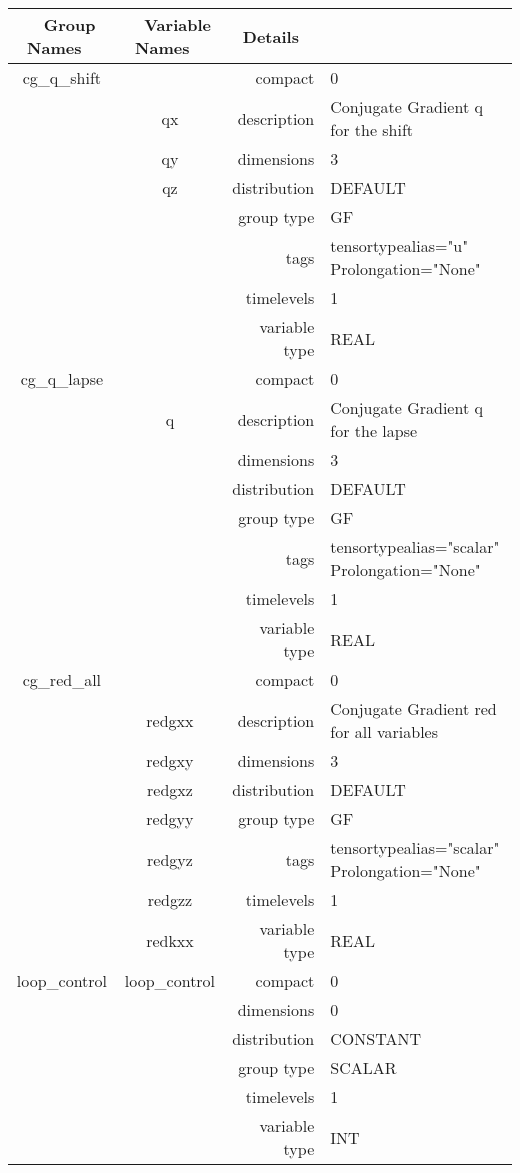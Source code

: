 \begin{tabular*}{150mm}{|c|c@{\extracolsep{\fill}}|rl|} \hline 
~ {\bf Group Names} ~ & ~ {\bf Variable Names} ~  &{\bf Details} ~ & ~ \\ 
\hline 
cg\_q\_shift &  & compact & 0 \\ 
 & qx & description & Conjugate Gradient q for the shift \\ 
 & qy & dimensions & 3 \\ 
 & qz & distribution & DEFAULT \\ 
 &  & group type & GF \\ 
 &  & tags & tensortypealias="u" Prolongation="None" \\ 
 &  & timelevels & 1 \\ 
 &  & variable type & REAL \\ 
\hline 
cg\_q\_lapse &  & compact & 0 \\ 
 & q & description & Conjugate Gradient q for the lapse \\ 
 &  & dimensions & 3 \\ 
 &  & distribution & DEFAULT \\ 
 &  & group type & GF \\ 
 &  & tags & tensortypealias="scalar" Prolongation="None" \\ 
 &  & timelevels & 1 \\ 
 &  & variable type & REAL \\ 
\hline 
cg\_red\_all &  & compact & 0 \\ 
 & redgxx & description & Conjugate Gradient red for all variables \\ 
 & redgxy & dimensions & 3 \\ 
 & redgxz & distribution & DEFAULT \\ 
 & redgyy & group type & GF \\ 
 & redgyz & tags & tensortypealias="scalar" Prolongation="None" \\ 
 & redgzz & timelevels & 1 \\ 
 & redkxx & variable type & REAL \\ 
\hline 
loop\_control & loop\_control & compact & 0 \\ 
 &  & dimensions & 0 \\ 
 &  & distribution & CONSTANT \\ 
 &  & group type & SCALAR \\ 
 &  & timelevels & 1 \\ 
 &  & variable type & INT \\ 
\hline 
\end{tabular*} 



